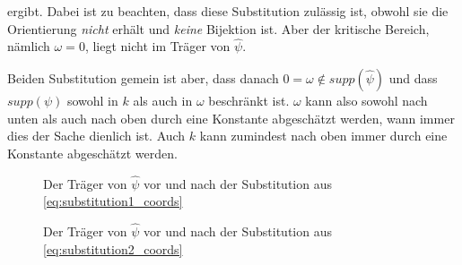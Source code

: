 ergibt. Dabei ist zu beachten, dass diese Substitution zulässig ist, obwohl sie
die Orientierung \emph{nicht} erhält und \emph{keine} Bijektion ist. Aber
der kritische Bereich, nämlich $\omega = 0$, liegt nicht im Träger von $\hat{\psi}$.

Beiden Substitution gemein ist aber, dass danach
$0=\omega \notin supp (\hat\psi)$ und dass $supp (\psi)$ sowohl in $k$ als auch in $\omega$ beschränkt ist. $\omega$ kann also sowohl nach unten als auch nach oben durch eine Konstante abgeschätzt werden, wann immer dies der Sache dienlich ist. Auch $k$ kann zumindest nach oben immer durch eine Konstante abgeschätzt werden.

\begin{figure}[h]
    \centering
    \begin{minipage}{0.5\textwidth}
        \centering
        \resizebox{\textwidth}{!}{} %
        \caption{Der Träger von $\hat\psi$ vor und nach der Substitution aus \cref{eq:substitution1_coords}}
        \label{fig:supp_psi_substitution1}
    \end{minipage}\hfill
    \begin{minipage}{0.5\textwidth}
        \centering
        \resizebox{\textwidth}{!}{}
        \caption{Der Träger von $\hat\psi$ vor und nach der Substitution aus \cref{eq:substitution2_coords}}
        \label{fig:supp_psi_substitution2}
    \end{minipage}
\end{figure}
